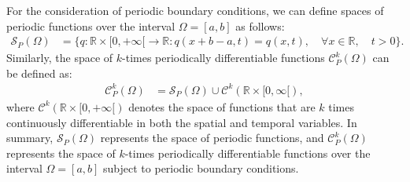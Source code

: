 For the consideration of periodic boundary conditions, we can define spaces of periodic functions over 
the interval $\Omega=[a,b]$ as follows:
\begin{align*}
	\mathcal{S}_P(\Omega) &= \{q:\mathbb{R}\times[0,+\infty[\to \mathbb{R}: q(x+b-a,t)=q(x,t), \quad \forall x \in \mathbb{R}, \quad t>0\}.
\end{align*}
Similarly, the space of $k$-times periodically differentiable functions $\mathcal{C}_P^k(\Omega)$ can be defined as:
\begin{align*}
	\mathcal{C}_P^k(\Omega) &= \mathcal{S}_P(\Omega)\cup \mathcal{C}^k(\mathbb{R}\times[0,\infty[),
\end{align*}
where $\mathcal{C}^k(\mathbb{R}\times[0,+\infty[)$ denotes the space of functions that are $k$ 
times continuously differentiable in both the spatial and temporal variables.
In summary, $\mathcal{S}_P(\Omega)$ represents the space of periodic functions, and $\mathcal{C}_P^k(\Omega)$
represents the space of $k$-times periodically differentiable functions over the interval $\Omega=[a,b]$ subject to periodic boundary conditions.

